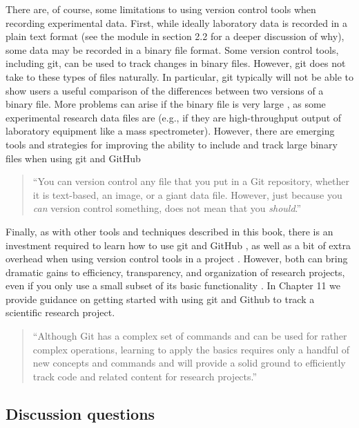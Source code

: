 \documentclass[]{tufte-book}
\begin{document}
There are, of course, some limitations to using version control tools when
recording experimental data. First, while ideally laboratory data is recorded in
a plain text format (see the module in section 2.2 for a deeper discussion of
why), some data may be recorded in a binary file format. Some version control
tools, including git, can be used to track changes in binary files. However, git
does not take to these types of files naturally. In particular, git typically
will not be able to show users a useful comparison of the differences between
two versions of a binary file. More problems can arise if the binary file is
very large \citep{perez2016ten, blischak2016quick}, as some experimental research
data files are (e.g., if they are high-throughput output of laboratory equipment
like a mass spectrometer). However, there are emerging tools and strategies for
improving the ability to include and track large binary files when using git and
GitHub \citep{blischak2016quick}

\begin{quote}
``You can version control any file that you put in a Git repository, whether it is
text-based, an image, or a giant data file. However, just because you \emph{can} version
control something, does not mean that you \emph{should}.'' \citep{blischak2016quick}
\end{quote}

Finally, as with other tools and techniques described in this book, there is an
investment required to learn how to use git and GitHub \citep{perez2016ten}, as well
as a bit of extra overhead when using version control tools in a project
\citep{raymond2003art}. However, both can bring dramatic gains to efficiency,
transparency, and organization of research projects, even if you only use a
small subset of its basic functionality \citep{perez2016ten}. In Chapter 11 we
provide guidance on getting started with using git and Github to track a
scientific research project.

\begin{quote}
``Although Git has a complex set of commands and can be used for rather complex
operations, learning to apply the basics requires only a handful of new concepts
and commands and will provide a solid ground to efficiently track code and related
content for research projects.'' \citep{perez2016ten}
\end{quote}

\hypertarget{discussion-questions-3}{%
\subsection{Discussion questions}\label{discussion-questions-3}}
\end{document}
